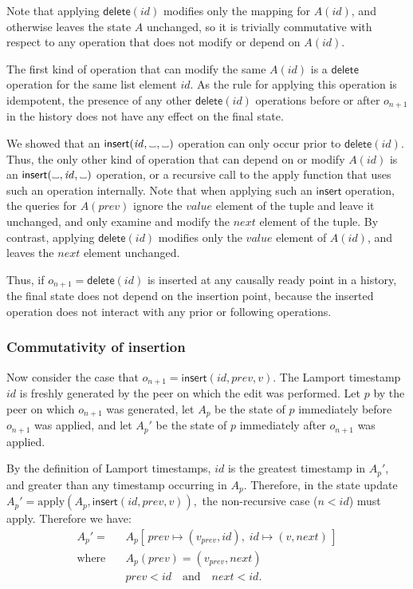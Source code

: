 \documentclass[a4paper,twocolumn,10pt]{article}
\newcommand{\placeholder}{%
  \makebox[0.7em]{%
    \kern.07em
    \vrule height.3ex
    \hrulefill
    \vrule height.3ex
    \kern.07em
  }%
}
\begin{document}
Note that applying $\mathsf{delete}(\mathit{id})$ modifies only the mapping for $A(\mathit{id})$, and otherwise leaves the state $A$ unchanged, so it is trivially commutative with respect to any operation that does not modify or depend on $A(\mathit{id})$.

The first kind of operation that can modify the same $A(\mathit{id})$ is a $\mathsf{delete}$ operation for the same list element $\mathit{id}$. As the rule for applying this operation is idempotent, the presence of any other $\mathsf{delete}(\mathit{id})$ operations before or after $o_{n+1}$ in the history does not have any effect on the final state.

We showed that an $\mathsf{insert}(\mathit{id}, \placeholder, \placeholder)$ operation can only occur prior to $\mathsf{delete}(\mathit{id})$. Thus, the only other kind of operation that can depend on or modify $A(\mathit{id})$ is an $\mathsf{insert}(\placeholder, \mathit{id}, \placeholder)$ operation, or a recursive call to the $\mathrm{apply}$ function that uses such an operation internally. Note that when applying such an $\mathsf{insert}$ operation, the queries for $A(\mathit{prev})$ ignore the $\mathit{value}$ element of the tuple and leave it unchanged, and only examine and modify the $\mathit{next}$ element of the tuple. By contrast, applying $\mathsf{delete}(\mathit{id})$ modifies only the $\mathit{value}$ element of $A(\mathit{id})$, and leaves the $\mathit{next}$ element unchanged.

Thus, if $o_{n+1}=\mathsf{delete}(\mathit{id})$ is inserted at any causally ready point in a history, the final state does not depend on the insertion point, because the inserted operation does not interact with any prior or following operations.

\subsubsection{Commutativity of insertion}

Now consider the case that $o_{n+1}=\mathsf{insert}(\mathit{id}, \mathit{prev}, v)$. The Lamport timestamp $\mathit{id}$ is freshly generated by the peer on which the edit was performed. Let $p$ by the peer on which $o_{n+1}$ was generated, let $A_p$ be the state of $p$ immediately before $o_{n+1}$ was applied, and let $A_p'$ be the state of $p$ immediately after $o_{n+1}$ was applied.

By the definition of Lamport timestamps, $\mathit{id}$ is the greatest timestamp in $A_p'$, and greater than any timestamp occurring in $A_p$. Therefore, in the state update $A_p' = \mathrm{apply}(A_p, \mathsf{insert}(\mathit{id}, \mathit{prev}, v)),$ the non-recursive case ($n < \mathit{id}$) must apply. Therefore we have:
\begin{align*}
A_p' =\; & A_p[\,\mathit{prev} \mapsto (v_\mathit{prev}, \mathit{id}),\; \mathit{id} \mapsto (v, \mathit{next})\,] \\
\text{where}\quad & A_p(\mathit{prev}) = (v_\mathit{prev}, \mathit{next}) \\
& \mathit{prev} < \mathit{id} \quad\text{and}\quad \mathit{next} < \mathit{id}.
\end{align*}
\end{document}

